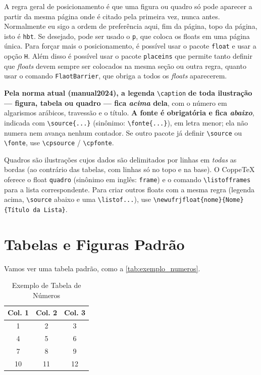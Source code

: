 \documentclass[dsc,pdfa,setavermelha]{ufrj}
\theoremstyle{plain}
\theoremstyle{definition}
\theoremstyle{remark}
\begin{document}
A regra geral de posicionamento é que uma figura ou quadro só pode aparecer a partir da mesma página onde é citado pela primeira vez, nunca antes. Normalmente eu sigo a ordem de preferência aqui, fim da página, topo da página, isto é \verb*|hbt|. Se desejado, pode ser usado o \verb*|p|, que coloca os floats em uma página única. Para forçar mais o posicionamento, é possível usar o pacote \verb*|float| e usar a opção \verb*|H|. Além disso é possível usar o pacote \verb*|placeins| que permite tanto definir que \textit{floats} devem sempre ser colocados na mesma seção ou outra regra, quanto usar o comando \verb*|FlaotBarrier|, que obriga a todos os \textit{floats} aparecerem.

\textbf{Pela norma atual (manual2024), a legenda} \verb|\caption| \textbf{de toda ilustração --- figura, tabela ou quadro --- fica \emph{acima} dela}, com o número em algarismos arábicos, travessão e o título. \textbf{A fonte é obrigatória e fica \emph{abaixo}}, indicada com \verb|\source{...}| (sinônimo: \verb|\fonte{...}|), em letra menor; ela não numera nem avança nenhum contador. Se outro pacote já definir \verb|\source| ou \verb|\fonte|, use \verb|\cpsource| / \verb|\cpfonte|.

Quadros são ilustrações cujos dados são delimitados por linhas em \emph{todas} as bordas (ao contrário das tabelas, com linhas só no topo e na base). O CoppeTeX oferece o float \verb|quadro| (sinônimo em inglês: \verb|frame|) e o comando \verb|\listofframes| para a lista correspondente. Para criar outros floats com a mesma regra (legenda acima, \verb|\source| abaixo e uma \verb|\listof...|), use \verb|\newufrjfloat{nome}{Nome}{Título da Lista}|.

\section{Tabelas e Figuras Padrão}

Vamos ver uma tabela padrão, como a \autoref{tab:exemplo_numeros}.

\begin{table}[ht]
\centering %
\caption{Exemplo de Tabela de Números}
\label{tab:exemplo_numeros}
\begin{tabular}{ccc} %
\hline %
\textbf{Col. 1} & \textbf{Col. 2} & \textbf{Col. 3} \\ %
\hline %
1 & 2 & 3 \\ %
\hline
4 & 5 & 6 \\ %
\hline
7 & 8 & 9 \\ %
\hline
10 & 11 & 12 \\ %
\hline %
\end{tabular}
\end{table}
\end{document}
